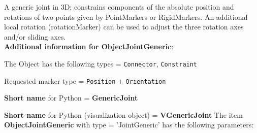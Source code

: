 \label{sec:item:ObjectJointGeneric}
A generic joint in 3D; constrains components of the absolute position and rotations of two points given by PointMarkers or RigidMarkers. An additional local rotation (rotationMarker) can be used to adjust the three rotation axes and/or sliding axes.\vspace{12pt}
 \\{\bf Additional information for ObjectJointGeneric}:
\bi
  \item The Object has the following types = \texttt{Connector}, \texttt{Constraint}
  \item Requested marker type = \texttt{Position} + \texttt{Orientation}
  \item {\bf Short name} for Python = {\bf GenericJoint}  \item {\bf Short name} for Python (visualization object) = {\bf VGenericJoint}\ei
\vspace{12pt} \noindent The item {\bf ObjectJointGeneric} with type = 'JointGeneric' has the following parameters:\vspace{-1cm}\\ 
